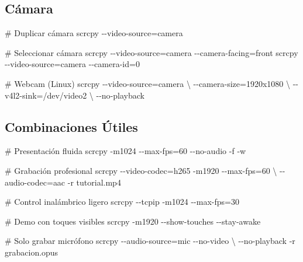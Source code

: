 \documentclass[
  doc,
  floatsintext,
  longtable,
  a4paper,
  nolmodern,
  notxfonts,
  notimes,
  12pt,
  colorlinks=true,linkcolor=blue,citecolor=blue,urlcolor=blue]{apa7}
\newenvironment{Shaded}{\begin{snugshade}}{\end{snugshade}}
\newcommand{\AttributeTok}[1]{\textcolor[rgb]{0.40,0.45,0.13}{#1}}
\newcommand{\CommentTok}[1]{\textcolor[rgb]{0.37,0.37,0.37}{#1}}
\newcommand{\DataTypeTok}[1]{\textcolor[rgb]{0.68,0.00,0.00}{#1}}
\newcommand{\ExtensionTok}[1]{\textcolor[rgb]{0.00,0.23,0.31}{#1}}
\newcommand{\NormalTok}[1]{\textcolor[rgb]{0.00,0.23,0.31}{#1}}
\newcommand{\OperatorTok}[1]{\textcolor[rgb]{0.37,0.37,0.37}{#1}}
\begin{document}
\subsection{Cámara}\label{cuxe1mara}

\begin{Shaded}
\begin{Highlighting}[]
\CommentTok{\# Duplicar cámara}
\ExtensionTok{scrcpy} \AttributeTok{{-}{-}video{-}source}\OperatorTok{=}\NormalTok{camera}

\CommentTok{\# Seleccionar cámara}
\ExtensionTok{scrcpy} \AttributeTok{{-}{-}video{-}source}\OperatorTok{=}\NormalTok{camera }\AttributeTok{{-}{-}camera{-}facing}\OperatorTok{=}\NormalTok{front}
\ExtensionTok{scrcpy} \AttributeTok{{-}{-}video{-}source}\OperatorTok{=}\NormalTok{camera }\AttributeTok{{-}{-}camera{-}id}\OperatorTok{=}\NormalTok{0}

\CommentTok{\# Webcam (Linux)}
\ExtensionTok{scrcpy} \AttributeTok{{-}{-}video{-}source}\OperatorTok{=}\NormalTok{camera }\DataTypeTok{\textbackslash{}}
  \AttributeTok{{-}{-}camera{-}size}\OperatorTok{=}\NormalTok{1920x1080 }\DataTypeTok{\textbackslash{}}
  \AttributeTok{{-}{-}v4l2{-}sink}\OperatorTok{=}\NormalTok{/dev/video2 }\DataTypeTok{\textbackslash{}}
  \AttributeTok{{-}{-}no{-}playback}
\end{Highlighting}
\end{Shaded}

\subsection{Combinaciones Útiles}\label{combinaciones-uxfatiles}

\begin{Shaded}
\begin{Highlighting}[]
\CommentTok{\# Presentación fluida}
\ExtensionTok{scrcpy} \AttributeTok{{-}m1024} \AttributeTok{{-}{-}max{-}fps}\OperatorTok{=}\NormalTok{60 }\AttributeTok{{-}{-}no{-}audio} \AttributeTok{{-}f} \AttributeTok{{-}w}

\CommentTok{\# Grabación profesional}
\ExtensionTok{scrcpy} \AttributeTok{{-}{-}video{-}codec}\OperatorTok{=}\NormalTok{h265 }\AttributeTok{{-}m1920} \AttributeTok{{-}{-}max{-}fps}\OperatorTok{=}\NormalTok{60 }\DataTypeTok{\textbackslash{}}
  \AttributeTok{{-}{-}audio{-}codec}\OperatorTok{=}\NormalTok{aac }\AttributeTok{{-}r}\NormalTok{ tutorial.mp4}

\CommentTok{\# Control inalámbrico ligero}
\ExtensionTok{scrcpy} \AttributeTok{{-}{-}tcpip} \AttributeTok{{-}m1024} \AttributeTok{{-}{-}max{-}fps}\OperatorTok{=}\NormalTok{30}

\CommentTok{\# Demo con toques visibles}
\ExtensionTok{scrcpy} \AttributeTok{{-}m1920} \AttributeTok{{-}{-}show{-}touches} \AttributeTok{{-}{-}stay{-}awake}

\CommentTok{\# Solo grabar micrófono}
\ExtensionTok{scrcpy} \AttributeTok{{-}{-}audio{-}source}\OperatorTok{=}\NormalTok{mic }\AttributeTok{{-}{-}no{-}video} \DataTypeTok{\textbackslash{}}
  \AttributeTok{{-}{-}no{-}playback} \AttributeTok{{-}r}\NormalTok{ grabacion.opus}
\end{Highlighting}
\end{Shaded}
\end{document}
